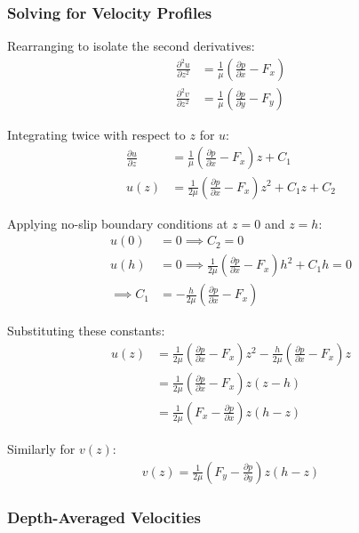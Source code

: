 \documentclass[12pt,a4paper]{article}
\begin{document}
    

\subsubsection*{Solving for Velocity Profiles}

Rearranging to isolate the second derivatives:
\begin{align}
    \frac{\partial^2 u}{\partial z^2} &= \frac{1}{\mu}\left(\frac{\partial p}{\partial x} - F_x\right) \\
    \frac{\partial^2 v}{\partial z^2} &= \frac{1}{\mu}\left(\frac{\partial p}{\partial y} - F_y\right)
\end{align}

Integrating twice with respect to $z$ for $u$:
\begin{align}
    \frac{\partial u}{\partial z} &= \frac{1}{\mu}\left(\frac{\partial p}{\partial x} - F_x\right)z + C_1 \\
    u(z) &= \frac{1}{2\mu}\left(\frac{\partial p}{\partial x} - F_x\right)z^2 + C_1 z + C_2
\end{align}

Applying no-slip boundary conditions at $z=0$ and $z=h$:
\begin{align}
    u(0) &= 0 \implies C_2 = 0 \\
    u(h) &= 0 \implies \frac{1}{2\mu}\left(\frac{\partial p}{\partial x} - F_x\right)h^2 + C_1 h = 0 \\
    \implies C_1 &= -\frac{h}{2\mu}\left(\frac{\partial p}{\partial x} - F_x\right)
\end{align}

Substituting these constants:
\begin{align}
    u(z) &= \frac{1}{2\mu}\left(\frac{\partial p}{\partial x} - F_x\right)z^2 - \frac{h}{2\mu}\left(\frac{\partial p}{\partial x} - F_x\right)z \\
    &= \frac{1}{2\mu}\left(\frac{\partial p}{\partial x} - F_x\right)z(z-h) \\
    &= \frac{1}{2\mu}\left(F_x - \frac{\partial p}{\partial x}\right)z(h-z)
\end{align}

Similarly for $v(z)$:
\begin{align}
    v(z) = \frac{1}{2\mu}\left(F_y - \frac{\partial p}{\partial y}\right)z(h-z)
\end{align}

\subsubsection*{Depth-Averaged Velocities}
\end{document}
